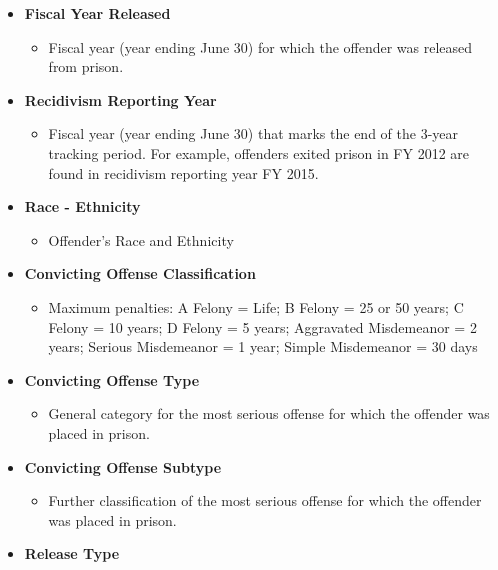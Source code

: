 \documentclass[11pt]{article}
\providecommand{\tightlist}{%
      \setlength{\itemsep}{0pt}\setlength{\parskip}{0pt}}
\begin{document}
    \begin{itemize}
\tightlist
\item
  \textbf{Fiscal Year Released}

  \begin{itemize}
  \tightlist
  \item
    Fiscal year (year ending June 30) for which the offender was
    released from prison.
  \end{itemize}
\item
  \textbf{Recidivism Reporting Year}

  \begin{itemize}
  \tightlist
  \item
    Fiscal year (year ending June 30) that marks the end of the 3-year
    tracking period. For example, offenders exited prison in FY 2012 are
    found in recidivism reporting year FY 2015.
  \end{itemize}
\item
  \textbf{Race - Ethnicity}

  \begin{itemize}
  \tightlist
  \item
    Offender's Race and Ethnicity
  \end{itemize}
\item
  \textbf{Convicting Offense Classification}

  \begin{itemize}
  \tightlist
  \item
    Maximum penalties: A Felony = Life; B Felony = 25 or 50 years; C
    Felony = 10 years; D Felony = 5 years; Aggravated Misdemeanor = 2
    years; Serious Misdemeanor = 1 year; Simple Misdemeanor = 30 days
  \end{itemize}
\item
  \textbf{Convicting Offense Type}

  \begin{itemize}
  \tightlist
  \item
    General category for the most serious offense for which the offender
    was placed in prison.
  \end{itemize}
\item
  \textbf{Convicting Offense Subtype}

  \begin{itemize}
  \tightlist
  \item
    Further classification of the most serious offense for which the
    offender was placed in prison.
  \end{itemize}
\item
  \textbf{Release Type}


\end{itemize}
\end{document}
